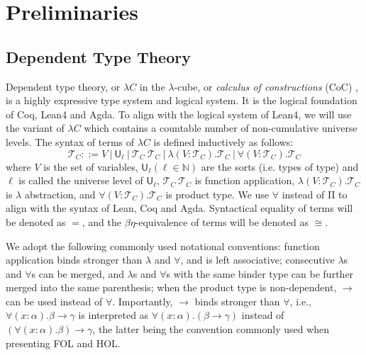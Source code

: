 \section{Preliminaries}

\subsection{Dependent Type Theory}\label{subdtt}

  Dependent type theory, or $\lambda C$ in the $\lambda$-cube,
  or \textit{calculus of constructions} (CoC) \cite{LambdaWithType},
  is a highly expressive type system and logical system. It is the logical
  foundation of Coq, Lean4 and Agda. To align with the logical system of
  Lean4, we will use the variant of $\lambda C$ which contains a countable
  number of non-cumulative universe levels. The syntax of terms of $\lambda C$ is defined
  inductively as follows:
  $$\mathcal{T}_C ::= V \ | \ \mathsf{U}_\ell \ | \ \mathcal{T}_C \ \mathcal{T}_C \ |
    \ \lambda (V : \mathcal{T}_C). \mathcal{T}_C \ | \ \forall (V : \mathcal{T}_C). \mathcal{T}_C$$
  where $V$ is the set of variables, $\mathsf{U}_\ell (\ell \in \mathbb{N})$ are
  the sorts (i.e. types of type) and $\ell$ is called the universe level
  of $\mathsf{U}_\ell$, $\mathcal{T}_C \ \mathcal{T}_C$ is function application,
  $\lambda (V : \mathcal{T}_C). \mathcal{T}_C$ is $\lambda$ abstraction, and
  $\forall (V : \mathcal{T}_C). \mathcal{T}_C$ is product type.
  We use $\forall$ instead of $\mathrm{\Pi}$ to align with the syntax of Lean, Coq and Agda.
  Syntactical equality of terms will be denoted as $=$, and the $\beta\eta$-equivalence of terms will be
  denoted as $\cong$.
  
  We adopt the following commonly used notational conventions:
  function application binds stronger than $\lambda$ and $\forall$, and is left associative;
  consecutive $\lambda$s and $\forall$s can be merged, and $\lambda$s and $\forall$s with the same
  binder type can be further merged into the same parenthesis; when the product type is non-dependent,
  $\to$ can be used instead of $\forall$. Importantly, $\to$ binds stronger than $\forall$, i.e.,
  $\forall (x : \alpha). \beta \to \gamma$ is interpreted as $\forall (x : \alpha). (\beta \to \gamma)$
  instead of $(\forall (x : \alpha). \beta) \to \gamma$, the latter being the convention commonly used
  when presenting FOL and HOL.

